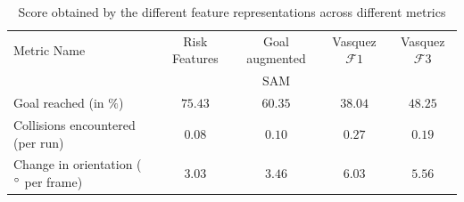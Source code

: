 \begin{table}[htbp]
	\begin{center}
		\renewcommand{\arraystretch}{1.3}
		\begin{tabular}{|p{2.5cm}|c|c|c|c|}
			\hline
			Metric Name & Risk Features & Goal augmented  & Vasquez $\mathcal{F}1$  & Vasquez $\mathcal{F}3$ \\
			&   & SAM  & &  \\
			\hline
			Goal reached (in $\%$) & $75.43$ & $60.35$ & $38.04$ & $48.25$ \\
			Collisions encountered (per run) & $0.08$ & $0.10$ & $ 0.27$ & $0.19$ \\
			Change in orientation ( $\degree$ per frame) & $3.03$ & $3.46$ &  $6.03$ & $5.56$\\
			\hline
		\end{tabular}
	\end{center}
	\caption{Score obtained by the different feature representations across different metrics}
	\label{tab:inter_irl_numerical_results_zara02}
\end{table}



